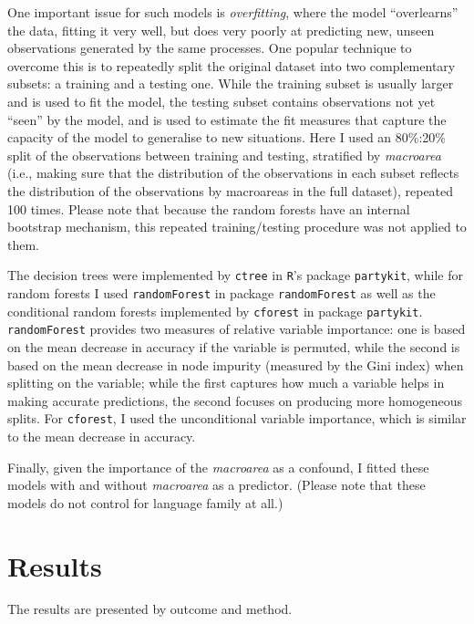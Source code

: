 \documentclass[twoside,onecolumn]{article}
\begin{document}
One important issue for such models is \emph{overfitting}, where the model ``overlearns'' the data, fitting it very well, but does very poorly at predicting new, unseen observations generated by the same processes.
One popular technique to overcome this is to repeatedly split the original dataset into two complementary subsets: a training and a testing one.
While the training subset is usually larger and is used to fit the model, the testing subset contains observations not yet ``seen'' by the model, and is used to estimate the fit measures that capture the capacity of the model to generalise to new situations.
Here I used an 80\%:20\% split of the observations between training and testing, stratified by \textit{macroarea} (i.e., making sure that the distribution of the observations in each subset reflects the distribution of the observations by macroareas in the full dataset), repeated 100 times.
Please note that because the random forests have an internal bootstrap mechanism, this repeated training/testing procedure was not applied to them.

The decision trees were implemented by \texttt{ctree} in \texttt{R}'s package \texttt{partykit}, while for random forests I used \texttt{randomForest} in package \texttt{randomForest} as well as the conditional random forests implemented by \texttt{cforest} in package \texttt{partykit}.
\texttt{randomForest} provides two measures of relative variable importance: one is based on the mean decrease in accuracy if the variable is permuted, while the second is based on the mean decrease in node impurity (measured by the Gini index) when splitting on the variable; while the first captures how much a variable helps in making accurate predictions, the second focuses on producing more homogeneous splits.
For \texttt{cforest}, I used the unconditional variable importance, which is similar to the mean decrease in accuracy.

Finally, given the importance of the \textit{macroarea} as a confound, I fitted these models with and without \textit{macroarea} as a predictor.
(Please note that these models do not control for language family at all.)



\section{Results}

The results are presented by outcome and method.
\end{document}
